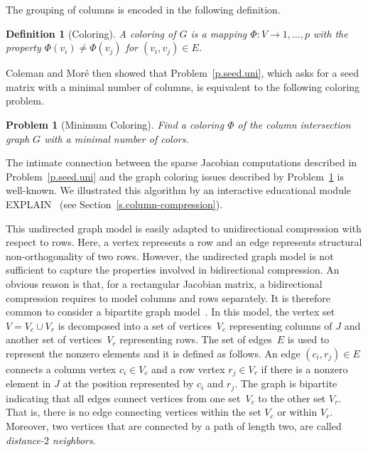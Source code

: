 \documentclass[12pt, oneside]{book}
\newtheorem{problem}{Problem}
\newtheorem{definition}{Definition}
\begin{document}
The grouping of columns is encoded in the following definition.
%
\begin{definition}[Coloring]
A coloring of $G$ is a mapping $\Phi : V \to {1, \dots, p}$ with the property
$\Phi(v_i)\neq \Phi(v_j)$ for $(v_i,v_j) \in E$.
\end{definition}
%
Coleman and Mor\'{e} \cite{Coleman1983EoS} then showed that Problem~\ref{p.seed.uni}, which
asks for a seed matrix with a minimal number of columns, is equivalent to the following
coloring problem.
%
\begin{problem}[Minimum Coloring]
\label{p:mincol}
%
Find a coloring $\Phi$ of the column intersection graph $G$ with a minimal number of
colors.
\end{problem}

The intimate connection between the sparse Jacobian computations described in
Problem~\ref{p.seed.uni} and the graph coloring issues described by Problem~\ref{p:mincol} is
well-known.
We illustrated this algorithm by an interactive educational module EXPLAIN~\cite{2013:05}
(see Section~\ref{s.column-compression}). 

This undirected graph model is easily adapted to unidirectional compression with respect
to rows. Here, a vertex represents a row and an edge represents structural
non-orthogonality of two rows. However, the undirected graph model is not sufficient to
capture the properties involved in bidirectional compression. An obvious reason is that,
for a rectangular Jacobian matrix, a bidirectional compression requires to model columns
and rows separately. It is therefore common to consider a bipartite graph
model~\cite{Coleman1996SaE,cv:ecs,hs:csj}. In this model, the vertex set $V=V_c\cup V_r$
is decomposed into a set of vertices~$V_c$ representing columns of $J$ and another set of
vertices~$V_r$ representing rows. The set of edges~$E$ is used to represent the nonzero
elements and it is defined as follows. An edge $(c_i , r_j) \in E$ connects a column
vertex $c_i \in V_c$ and a row vertex $r_j \in V_r$ if there is a nonzero element in $J$
at the position represented by $c_i$ and $r_j$. The graph is bipartite indicating that
all edges connect vertices from one set~$V_c$ to the other set $V_r$. That is, there is
no edge connecting vertices within the set $V_c$ or within $V_r$. Moreover, two vertices
that are connected by a path of length two, are called \emph{distance-$2$ neighbors}.
\end{document}
